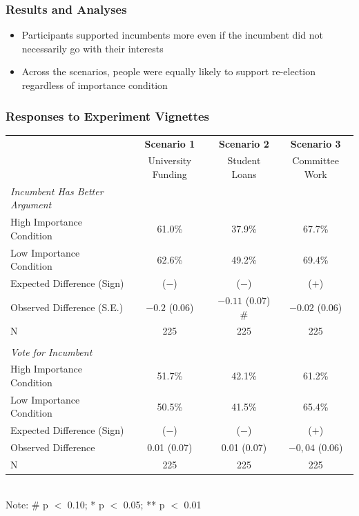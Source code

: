 \documentclass[14pt]{beamer}
\newcommand\e{\emph}
\newcommand\tb{\textbf}
\begin{document}
\begin{frame}
\frametitle{Results and Analyses}
\begin{itemize}
	\item Participants supported incumbents more even if the incumbent did not necessarily go with their interests
	\item Across the scenarios, people were equally likely to support re-election regardless of importance condition
\end{itemize}
\end{frame}

\begin{frame}
\frametitle{Responses to Experiment Vignettes}
\scriptsize
\begin{table}
	\centering
	\begin{tabulary}{\linewidth}{Lccc}
	\\
	\hline
	&\tb{Scenario 1}&\tb{Scenario 2}&\tb{Scenario 3}\\
	&University Funding& Student Loans&Committee Work\\
	\hline
	\e{Incumbent Has Better Argument}&&&\\
	High Importance Condition&61.0\%&37.9\%&67.7\% \\
	Low Importance Condition&62.6\%&49.2\%&69.4\%\\
	Expected Difference (Sign)& ($-$)&($-$)&($+$)\\
	Observed Difference (S.E.)&$-0.2$ (0.06)&$-0.11$ (0.07) \# &$-0.02$ (0.06)\\
	N&225&225&225\\
	&&&\\
	\e{Vote for Incumbent}&&&\\
	High Importance Condition&51.7\%&42.1\%&61.2\%\\
	Low Importance Condition&50.5\%&41.5\%&65.4\%\\
	Expected Difference (Sign)& ($-$)&($-$)&($+$)\\
	Observed Difference&0.01 (0.07)&0.01 (0.07)&$-0,04$ (0.06)\\
	N&225&225&225\\
	\hline
	\end{tabulary}\\
Note: \# p $<$ 0.10; * p $<$ 0.05; ** p $<$ 0.01
\end{table}
\end{frame}
\end{document}
